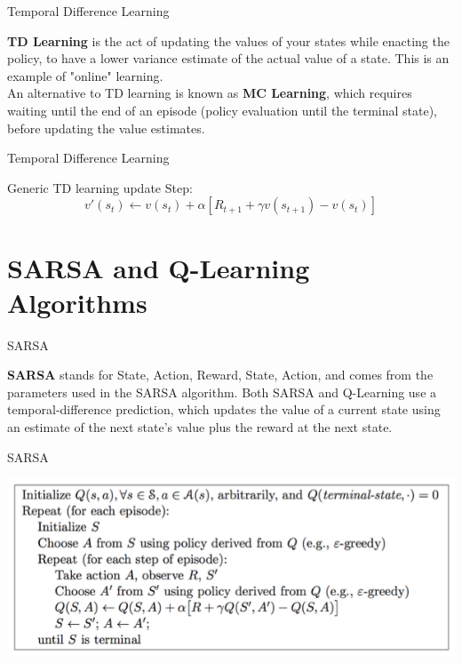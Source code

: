 \documentclass[10pt]{beamer}
\begin{document}
\begin{frame}{Temporal Difference Learning}

  \textbf{TD Learning} is the act of updating the values of your states
  while enacting the policy, to have a lower variance estimate of the actual
  value of a state. This is an example of "online" learning. \\An alternative
  to TD learning is known as \textbf{MC Learning}, which requires waiting
  until the end of an episode (policy evaluation until the terminal state),
  before updating the value estimates.

\end{frame}

\begin{frame}{Temporal Difference Learning}

  Generic TD learning update Step:
  $$ v'(s_t) \leftarrow v(s_t) + \alpha[R_{t+1} + \gamma v(s_{t+1}) - v(s_t)] $$

\end{frame}

\section{SARSA and Q-Learning Algorithms}

\begin{frame}{SARSA}

  \textbf{SARSA} stands for State, Action, Reward, State, Action, and comes
  from the parameters used in the SARSA algorithm. Both SARSA and Q-Learning use
  a temporal-difference prediction, which updates the value of a current
  state using an estimate of the next state's value plus the reward
  at the next state.

\end{frame}

\begin{frame}{SARSA}

\includegraphics[width=\linewidth]{sarsa.png}

\end{frame}
\end{document}
